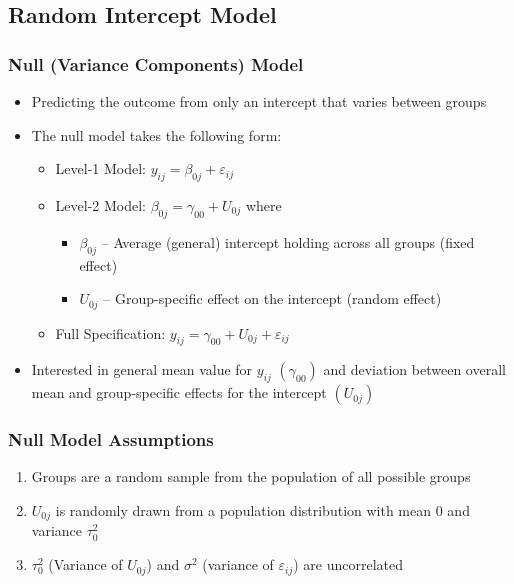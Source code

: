 \documentclass{beamer}
\begin{document}
\subsection{Random Intercept Model}

\begin{frame}
	\frametitle{Null (Variance Components) Model}
		\begin{itemize}
			\item Predicting the outcome from only an intercept that varies between groups
			\item The null model takes the following form:
				\begin{itemize}
					\item Level-1 Model: $y_{ij}=\beta_{0j}+\varepsilon_{ij}$
					\item Level-2 Model: $\beta_{0j}=\gamma_{00}+U_{0j}$ where
						\begin{itemize}
							\item $\beta_{0j}$ -- Average (general) intercept holding across all groups (fixed effect)
							\item $U_{0j}$ -- Group-specific effect on the intercept (random effect)
						\end{itemize}
					\item Full Specification: $y_{ij}=\gamma_{00}+U_{0j}+\varepsilon_{ij}$
				\end{itemize}
			\item Interested in general mean value for $y_{ij}$ $(\gamma_{00})$ and deviation between overall mean and group-specific effects for the intercept $(U_{0j})$
		\end{itemize}
\end{frame}

\begin{frame}
	\frametitle{Null Model Assumptions}
		\begin{enumerate}
			\item Groups are a random sample from the population of all possible groups
			\item $U_{0j}$ is randomly drawn from a population distribution with mean $0$ and variance $\tau^{2}_{0}$
			\item $\tau^{2}_{0}$ (Variance of $U_{0j}$) and $\sigma^2$ (variance of $\varepsilon_{ij}$) are uncorrelated
		\end{enumerate}
\end{frame}
\end{document}
